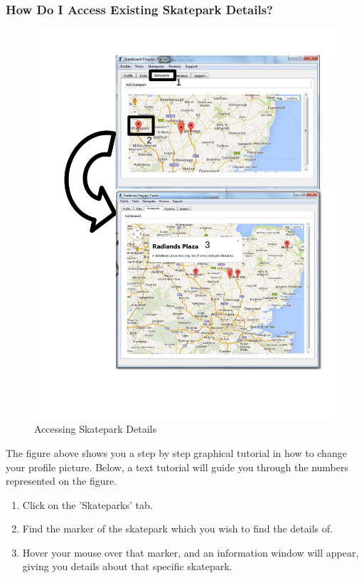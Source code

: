 \subsubsection{How Do I Access Existing Skatepark Details?}

\begin{figure}[H]
    \includegraphics[width=\textwidth]{./Manual/Images/SkateparkDetails.pdf}
    \caption{Accessing Skatepark Details} \label{fig:Skatepark Details}
\end{figure}

The figure above shows you a step by step graphical tutorial in how to change your profile picture. Below, a text tutorial will guide you through the numbers represented on the figure.

\begin{enumerate}
\item Click on the 'Skateparks' tab.
\item Find the marker of the skatepark which you wish to find the details of.
\item Hover your mouse over that marker, and an information window will appear, giving you details about that specific skatepark.
\end{enumerate}

